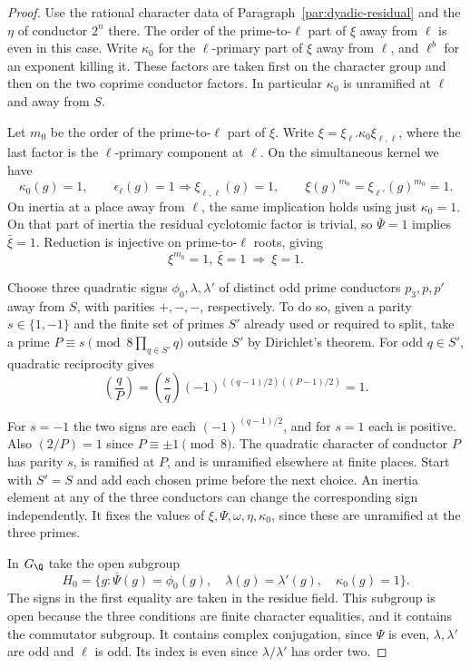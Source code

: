 \begin{proof}

Use the rational character data of
Paragraph~\ref{par:dyadic-residual} and the \(\eta\) of
conductor \(2^n\) there. The order of the prime-to-\(\ell\)
part of \(\xi\) away from \(\ell\) is even in this case.
Write \(\kappa_0\) for the \(\ell\)-primary part of \(\xi\)
away from \(\ell\), and \(\ell^b\) for an exponent killing
it. These factors are taken first on the character group
and then on the two coprime conductor factors. In
particular \(\kappa_0\) is unramified at \(\ell\) and away
from \(S\).

Let \(m_0\) be the order of the prime-to-\(\ell\)
part of \(\xi\). Write \(\xi=\xi_{\ell'}\kappa_0\xi_{\ell,\ell}\), where the last factor is the \(\ell\)-primary component at \(\ell\). On the simultaneous kernel we have
\[
 \kappa_0(g)=1,\qquad \epsilon_\ell(g)=1\Longrightarrow\xi_{\ell,\ell}(g)=1,
 \qquad \xi(g)^{m_0}=\xi_{\ell'}(g)^{m_0}=1 .
\] On inertia at a place away from
\(\ell\), the same implication holds using just
\(\kappa_0=1\). On that part of inertia the residual cyclotomic factor is
trivial, so \(\bar\Psi=1\) implies \(\bar\xi=1\). Reduction is
injective on prime-to-\(\ell\) roots, giving
\[
              \xi^{m_0}=1,\ \bar\xi=1\ \Longrightarrow\ \xi=1 .
\]

Choose three quadratic signs \(\phi_0,\lambda,\lambda'\)
of distinct odd prime conductors \(p_3,p,p'\) away
from \(S\), with parities \(+,-,-\), respectively.
To do so, given a parity \(s\in\{1,-1\}\) and
the finite set of primes \(S'\) already used or
required to split, take a prime
\(P\equiv s\pmod{8\prod_{q\in S'}q}\) outside \(S'\)
by Dirichlet's theorem. For odd \(q\in S'\), quadratic reciprocity gives
\[
 \left(\frac qP\right)
 =\left(\frac{s}{q}\right)(-1)^{((q-1)/2)((P-1)/2)}=1 .
\]

For \(s=-1\) the two signs are each \((-1)^{(q-1)/2}\), and for \(s=1\) each is positive. Also \((2/P)=1\) since \(P\equiv\pm1\pmod8\). The quadratic character
of conductor \(P\) has parity \(s\), is ramified at
\(P\), and is unramified elsewhere at finite places.
Start with \(S'=S\) and add each chosen prime before
the next choice. An inertia element at any of the
three conductors can change the corresponding sign
independently. It fixes the values of \(\xi,\Psi,\omega,\eta,\kappa_0\),
since these are unramified at the three primes.

In \(G_{\Q}\) take the open subgroup
\begin{equation}\label{eq:count-ii-starting-groups}
 H_0=\{g:\bar\Psi(g)=\phi_0(g),\quad
             \lambda(g)=\lambda'(g),\quad\kappa_0(g)=1\}.
\end{equation}
The signs in the first equality are taken in the
residue field. This subgroup is open because the
three conditions are finite character equalities,
and it contains the commutator subgroup. It contains
complex conjugation, since \(\Psi\) is even,
\(\lambda,\lambda'\) are odd and \(\ell\) is odd.
Its index is even since \(\lambda/\lambda'\) has
order two.


\end{proof}
